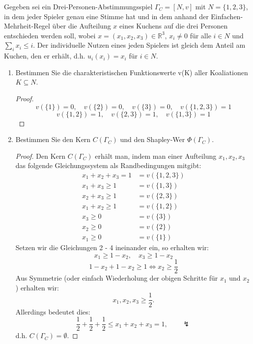 \documentclass[12pt]{extreport} %
\theoremstyle{named}
\theoremstyle{itshape}
\theoremstyle{normal}
\begin{document}
Gegeben sei ein Drei-Personen-Abstimmungsspiel $\Gamma_{C} = [N, v]$ mit $N = \{1, 2, 3\}$, in dem jeder Spieler genau eine Stimme hat und in dem anhand der Einfachen-Mehrheit-Regel über die Aufteilung $x$ eines Kuchens auf die drei Personen entschieden werden soll, wobei $x = (x_1, x_2, x_3) \in \mathbb{R}^{3}$, $x_i \neq 0$ für alle $i \in N$ und $\sum_{i} x_{i} \leq i$. Der individuelle Nutzen eines jeden Spielers ist gleich dem Anteil am Kuchen, den er erhält, d.h. $u_i(x_i) = x_i$ für $i \in N$.

\begin{enumerate}
	\item Bestimmen Sie die charakteristischen Funktionswerte v(K) aller Koaliationen $K \subseteq N$.
		\begin{proof}
			$$ v(\{ 1 \}) = 0, \quad v(\{ 2 \}) = 0, \quad v(\{ 3 \}) = 0, \quad v(\{ 1, 2,3 \}) = 1  $$
			$$ v(\{ 1, 2 \}) = 1, \quad  v(\{ 2, 3 \}) = 1, \quad v(\{ 1, 3 \}) = 1 $$
		\end{proof}
	\item Bestimmen Sie den Kern $C(\Gamma_C)$ und den Shapley-Wer $\Phi(\Gamma_C)$.
		\begin{proof}
			Den Kern $C(\Gamma_C)$ erhält man, indem man einer Aufteilung $x_1, x_2, x_3$ das folgende Gleichungssystem als Randbedingungen mitgibt:
			\begin{align*}
				x_{1} + x_{2} + x_{3} = 1 & = v(\{1, 2, 3 \}) \\
				x_{1} + x_{3} \geq 1 & = v(\{1, 3 \}) \\
				x_{2} + x_{3} \geq 1 & = v(\{ 2, 3 \}) \\
				x_{1} + x_{2} \geq 1 & = v(\{ 1, 2 \}) \\
				x_{3} \geq 0 & = v(\{ 3 \}) \\
			    x_{2} \geq 0 & = v(\{ 2 \}) \\
				x_{1} \geq 0 & = v(\{ 1 \})
			\end{align*}
			Setzen wir die Gleichungen 2 - 4 ineinander ein, so erhalten wir:
			$$ x_{1} \geq 1 - x_{2}, \quad x_{3} \geq 1 - x_{2} $$
			$$ 1 - x_{2} + 1 - x_{2} \geq 1 \iff x_{2} \geq \frac{1}{2} $$
			Aus Symmetrie (oder einfach Wiederholung der obigen Schritte für $x_{1}$ und $x_{2}$) erhalten wir:
			$$ x_{1}, x_{2}, x_{3} \geq \frac{1}{2}. $$
			Allerdings bedeutet dies:
			\begin{equation*}
				\frac{1}{2} + \frac{1}{2} + \frac{1}{2} \leq x_{1} + x_{2} + x_{3} = 1, \qquad \lightning
			\end{equation*} 
			d.h. $C(\Gamma_C) = \emptyset$. 

\end{proof}
\end{enumerate}
\end{document}
